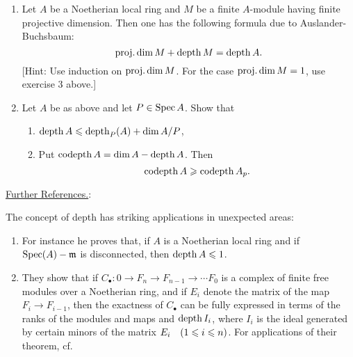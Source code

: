 \documentclass[../main]{subfiles}
\begin{document}
\begin{exercise}
\begin{enumerate}[label = \arabic*.]
\begin{enumerate}
    \end{enumerate}
    \item\label{ex:ch06.4} Let $A$ be a Noetherian local ring and $M$ be a finite $A$-module having finite projective dimension. Then one has the following formula due to Auslander-Buchsbaum: \[\operatorname{proj. dim} M+\operatorname{depth} M=\operatorname{depth} A.\]
    [Hint: Use induction on $\operatorname{proj. dim} M$. For the case $\operatorname{proj. dim} M=1$, use exercise 3 above.]
    \item\label{ex:ch06.5} Let $A$ be as above and let $P\in\operatorname{Spec} A$. Show that
    \begin{enumerate}
        \item $\operatorname{depth} A\leqslant\operatorname{depth}_P(A)+\operatorname{dim} A/P$,
        \item Put $\operatorname{codepth} A=\operatorname{dim} A-\operatorname{depth} A$. Then \[\operatorname{codepth} A\geqslant\operatorname{codepth} A_p.\]
    \end{enumerate}
\end{enumerate}
\end{exercise}

\underline{Further References.}:

The concept of depth has striking applications in
unexpected areas:
\begin{enumerate}[label=\arabic*.]
    \item \cite{hartshorne1962complete}
    
    For instance he proves that, if $A$ is a Noetherian local ring and if $\operatorname{Spec}(A)-\mathfrak{m}$ is disconnected, then $\operatorname{depth} A\leqslant1$.
    \item \cite{buchsbaum1973what}
    
    They show that if $C_\bullet : 0\longrightarrow F_n\longrightarrow F_{n-1}\longrightarrow\cdots F_0$ is a complex of finite free modules over a Noetherian ring, and if $E_i$ denote the matrix of the map $F_i \longrightarrow F_{i-1}$, then the exactness of $C_\bullet$ can be fully expressed in terms of the ranks of the modules and maps and $\operatorname{depth} I_i$, where $I_i$ is the ideal generated by certain minors of the matrix $E_i\for{1\leqslant i\leqslant n}$. For applications of their theorem, cf. \cite{eisenbud1975some}
\end{enumerate}
 
\end{document}
